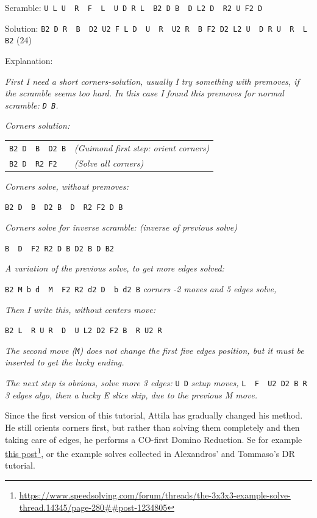 \documentclass[11pt,a4paper]{book}
\newcommand{\p}{\textquotesingle}
\newcommand{\m}{\texttt}
\newcommand{\ps}{\p\,\,}
\begin{document}
\begin{framed}
Scramble: \m{U L U\ps R\ps F\ps L\ps U D R L\ps B2 D B\ps D L2 D\ps R2 U F2 D}

\begin{center}

\end{center}

Solution: \m{B2 D R\ps B\ps D2 U2 F L D\ps U\ps R\ps U2 R\ps B F2 D2 L2 U\ps D R U\ps R\ps L B2} (24)

\bigskip
Explanation:
\begin{center}
\emph{First I need a short corners-solution, usually I try something with premoves, if the scramble seems too hard. In this case I found this premoves for normal scramble: \m{D B}.}
\end{center}
\emph{Corners solution:}
\begin{center}
\begin{tabular}{ll}
\m{B2 D\ps B\ps D2 B} & \emph{(Guimond first step: orient corners)}\\
\m{B2 D\ps R2 F2} & \emph{(Solve all corners)}
\end{tabular}
\end{center}
\emph{Corners solve, without premoves:}
\begin{center}
\m{B2 D\ps B\ps D2 B\ps D\ps R2 F2 D B}
\end{center}
\emph{Corners solve for inverse scramble: (inverse of previous solve)}
\begin{center}
\m{B\ps D\ps F2 R2 D B D2 B D B2}
\end{center}
\emph{A variation of the previous solve, to get more edges solved:}
\begin{center}
\m{B2 M b d\ps M\ps F2 R2 d2 D\ps b d2 B} \emph{corners -2 moves and 5 edges solve,}
\end{center}
\emph{Then I write this, without centers move:}
\begin{center}
\m{B2 L\ps R U R\ps D\ps U L2 D2 F2 B\ps R U2 R}
\end{center}

\emph{The second move (\m M) does not change the first five edges position, but it must be inserted to get the lucky ending.}

\emph{The next step is obvious, solve more 3 edges:} \m{U D} \emph{setup moves,} \m{L\ps F\ps U2 D2 B R} \emph{3 edges algo, then a lucky E slice skip, due to the previous M move.}
\end{framed}

Since the first version of this tutorial, Attila has gradually changed his method. He still orients corners first, but rather than solving them completely and then taking care of edges, he performs a CO-first Domino Reduction. Se for example \href{https://www.speedsolving.com/forum/threads/the-3x3x3-example-solve-thread.14345/page-280##post-1234805}{this post}\footnote{\url{https://www.speedsolving.com/forum/threads/the-3x3x3-example-solve-thread.14345/page-280##post-1234805}}, or the example solves collected in Alexandros' and Tommaso's DR tutorial.
\end{document}
